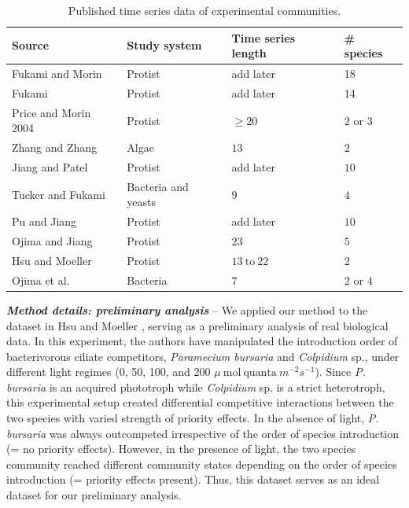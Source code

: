\documentclass[12pt, class=article, crop=false]{standalone}
\begin{document}
\begin{table}
    \flushleft
    \caption{Published time series data of experimental communities.}
    \begin{tabular}{llll}
         Source & Study system & Time series length & \# species\\
         \hline
         Fukami and Morin \citep{fukami_productivity-biodiversity_2003} & Protist & add later & 18\\
         Fukami \citep{fukami_assembly_2004} & Protist & add later & 14\\
         Price and Morin 2004 \citep{price_colonization_2004} & Protist & $\ge 20$ & $2$ or $3$ \\
         Zhang and Zhang \citep{zhang_colonization_2007} & Algae & $13$ & $2$\\
         Jiang and Patel \citep{jiang_community_2008} & Protist & add later & $10$\\
         Tucker and Fukami \citep{tucker_environmental_2014} & Bacteria and yeasts & $9$ & $4$\\
         Pu and Jiang \citep{pu_dispersal_2015} & Protist & add later & $10$\\
         Ojima and Jiang \citep{ojima_interactive_2017} & Protist & $23$ & $5$\\
         Hsu and Moeller \citep{hsu_metabolic_2021} & Protist & $13~\mbox{to}~22$ & $2$\\
         Ojima et al. \citep{ojima_priority_2022} & Bacteria & $7$ & $2$ or $4$\\
         \hline
    \end{tabular}
    \label{tab:expdata}
\end{table}

\textit{\textbf{Method details: preliminary analysis}} --
We applied our method to the dataset in Hsu and Moeller \citep{hsu_metabolic_2021}, serving as a preliminary analysis of real biological data.
In this experiment, the authors have manipulated the introduction order of bacterivorous ciliate competitors,
\textit{Paramecium bursaria} and \textit{Colpidium} sp., under different light regimes (0, 50, 100, and 200
$\mu~\mbox{mol}~\mbox{quanta}~m^{-2} s^{-1}$).
Since \textit{P. bursaria} is an acquired phototroph while \textit{Colpidium} sp. is a strict heterotroph, this experimental setup created differential competitive interactions between the two species with varied strength of priority effects.
In the absence of light, \textit{P. bursaria} was always outcompeted irrespective of the order of species introduction (= no priority effects).
However, in the presence of light, the two species community reached different community states depending on the order of species introduction (= priority effects present).
Thus, this dataset serves as an ideal dataset for our preliminary analysis.
\end{document}
